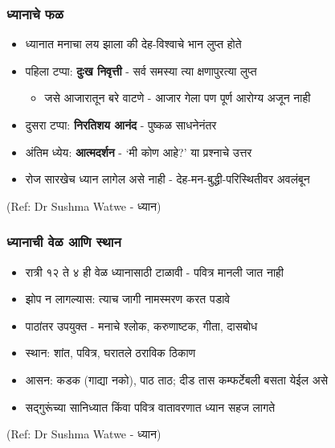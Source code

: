 \begin{frame}[fragile]\frametitle{ध्यानाचे फळ}

	\begin{itemize}
	\item ध्यानात मनाचा लय झाला की देह-विश्वाचे भान लुप्त होते
	\item पहिला टप्पा: \textbf{दुःख निवृत्ती} - सर्व समस्या त्या क्षणापुरत्या लुप्त
		\begin{itemize}
		\item जसे आजारातून बरे वाटणे - आजार गेला पण पूर्ण आरोग्य अजून नाही
		\end{itemize}
	\item दुसरा टप्पा: \textbf{निरतिशय आनंद} - पुष्कळ साधनेनंतर
	\item अंतिम ध्येय: \textbf{आत्मदर्शन} - `मी कोण आहे?' या प्रश्नाचे उत्तर
	\item रोज सारखेच ध्यान लागेल असे नाही - देह-मन-बुद्धी-परिस्थितीवर अवलंबून
	\end{itemize}

{\tiny (Ref: Dr Sushma Watwe - ध्यान)}

\end{frame}

\begin{frame}[fragile]\frametitle{ध्यानाची वेळ आणि स्थान}

	\begin{itemize}
	\item रात्री १२ ते ४ ही वेळ ध्यानासाठी टाळावी - पवित्र मानली जात नाही
	\item झोप न लागल्यास: त्याच जागी नामस्मरण करत पडावे
	\item पाठांतर उपयुक्त - मनाचे श्लोक, करुणाष्टक, गीता, दासबोध
	\item स्थान: शांत, पवित्र, घरातले ठराविक ठिकाण
	\item आसन: कडक (गाद्या नको), पाठ ताठ; दीड तास कम्फर्टेबली बसता येईल असे
	\item सद्गुरूंच्या सानिध्यात किंवा पवित्र वातावरणात ध्यान सहज लागते
	\end{itemize}

{\tiny (Ref: Dr Sushma Watwe - ध्यान)}

\end{frame}

